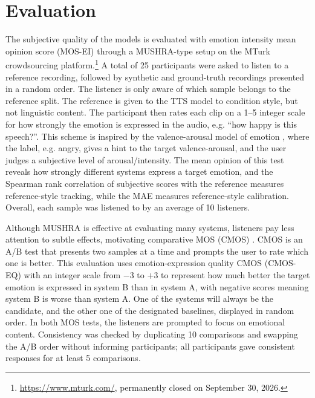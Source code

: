 \section{Evaluation}
The subjective quality of the models is evaluated with emotion intensity mean opinion score (MOS-EI) through a \ac{MUSHRA}-type setup on the MTurk crowdsourcing platform.\footnote{\url{https://www.mturk.com/}, permanently closed on September 30, 2026.} A total of 25 participants were asked to listen to a reference recording, followed by synthetic and ground-truth recordings presented in a random order. The listener is only aware of which sample belongs to the reference split. The reference is given to the \ac{TTS} model to condition style, but not linguistic content. The participant then rates each clip on a 1--5 integer scale for how strongly the emotion is expressed in the audio, e.g. ``how happy is this speech?''. This scheme is inspired by the valence-arousal model of emotion \citep{POSNER_RUSSELL_PETERSON_2005}, where the label, e.g. angry, gives a hint to the target valence-arousal, and the user judges a subjective level of arousal/intensity. The mean opinion of this test reveals how strongly different systems express a target emotion, and the Spearman rank correlation of subjective scores with the reference measures reference-style tracking, while the \ac{MAE} measures reference-style calibration. Overall, each sample was listened to by an average of 10 listeners.


Although \ac{MUSHRA} is effective at evaluating many systems, listeners pay less attention to subtle effects, motivating comparative MOS (CMOS) \citep{li2023styletts2,ju2024naturalspeech3,minixhofer2024ttsds}. CMOS is an A/B test that presents two samples at a time and prompts the user to rate which one is better. This evaluation uses emotion-expression quality CMOS (CMOS-EQ) with an integer scale from $-3$ to $+3$ to represent how much better the target emotion is expressed in system B than in system A, with negative scores meaning system B is worse than system A. One of the systems will always be the candidate, and the other one of the designated baselines, displayed in random order. In both \ac{MOS} tests, the listeners are prompted to focus on emotional content. Consistency was checked by duplicating 10 comparisons and swapping the A/B order without informing participants; all participants gave consistent responses for at least 5 comparisons.

